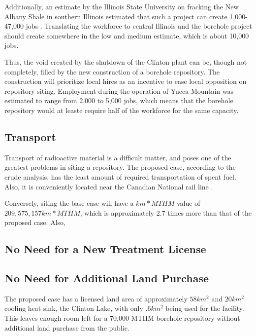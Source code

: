 Additionally, an estimate by the Illinois State University on fracking the New Albany
Shale in southern Illinois estimated that such a project can create 1,000-47,000 jobs
\cite{Loomis_2012}. Translating the workforce to central Illinois and the borehole
project should create somewhere in the low and medium estimate, which is about 10,000
jobs.



Thus, the void created by the shutdown of the Clinton plant can be, though not
completely, filled by the new construction of a borehole repository. The construction
will prioritize local hires as an incentive to ease local opposition on repository
 siting. Employment during the operation of Yucca Mountain was estimated to range from
 2,000 to 5,000 jobs, \cite{Riddel_2003} which means that the borehole repository
 would at leaste require half of the workforce for the same capacity.  

\subsection{Transport}
Transport of radioactive material is a difficult matter, and poses one of the greatest
problems in siting a repository. The proposed case, according to the crude analysis,
has the least amount of required transportation of spent fuel. Also, it is
conveniently located near the Canadian National rail line \cite{waleed_regional_2015}. 




Conversely, siting the base case will have a $km*MTHM$ value of $209,575,157 km*MTHM$, 
which is approximately 2.7 times more than that of the proposed case. Also, %

\subsection{No Need for a New Treatment License}


\subsection{No Need for Additional Land Purchase}
The proposed case has a licensed land area of approximately $58km^2$ and $20km^2$
 cooling heat sink, the Clinton Lake, with only $.6km^2$ being used for the facility.
  \cite{NRC_Clinton} This leaves enough room left for a 70,000 \gls{MTHM} borehole
  repository without additional land purchase from the public.
  
